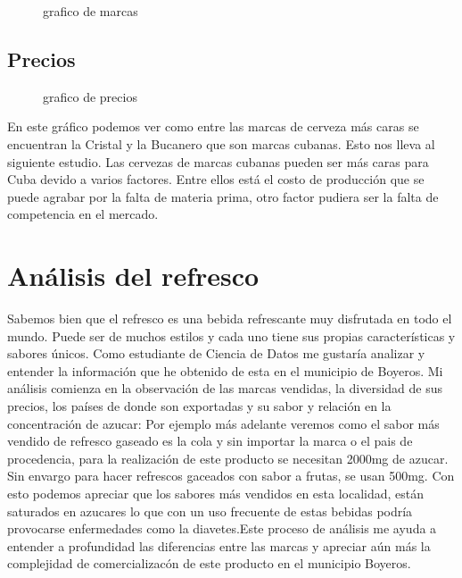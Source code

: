 \documentclass[]{article}
\begin{document}
 
 \begin{figure}[h]
 	\caption{grafico de marcas}
 	\label{fig:logo}
 \end{figure}

\subsection{Precios}\label{sub:center}
\begin{figure}[h]
	\caption{grafico de precios}
	\label{fig:logo}
\end{figure}
En este gráfico podemos ver como entre las marcas de cerveza más caras se encuentran la Cristal y la Bucanero que son marcas cubanas. Esto nos lleva al siguiente estudio. Las cervezas de marcas cubanas pueden ser más caras para Cuba devido a varios factores. Entre ellos está el costo de producción que se puede agrabar por la falta de materia prima, otro factor pudiera ser la falta de competencia en el mercado.

\section{Análisis del refresco}
Sabemos bien que el refresco es una bebida refrescante muy disfrutada en todo el mundo. Puede ser de muchos estilos y cada uno tiene sus propias características y sabores únicos. Como estudiante de Ciencia de Datos me gustaría analizar y entender la información que he obtenido de esta en el municipio de Boyeros. Mi análisis comienza en la observación de las marcas vendidas, la diversidad de sus precios, los países de donde son exportadas y su sabor y relación en la concentración de azucar: Por ejemplo más adelante veremos como el sabor más vendido de refresco gaseado es la cola y sin importar la marca o el pais de procedencia, para la realización de este producto se necesitan 2000mg de azucar. Sin envargo para hacer refrescos gaceados con sabor a frutas, se usan 500mg. Con esto podemos apreciar que los sabores más vendidos en esta localidad, están saturados en azucares lo que con un uso frecuente de estas bebidas podría provocarse enfermedades como la diavetes.Este proceso de análisis me ayuda a entender a profundidad las diferencias entre las marcas y apreciar aún más la complejidad de comercializacón de este producto en el municipio Boyeros.
\end{document}
